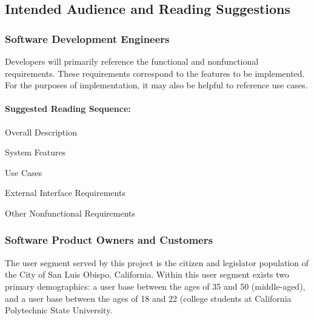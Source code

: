 \documentclass[12pt,oneside,letterpaper]{article}
\newcounter{use_case}
\newcounter{functional_requirement}
\begin{document}
\subsection{Intended Audience and Reading Suggestions}

\subsubsection{Software Development Engineers}
Developers will primarily reference the functional and nonfunctional
requirements. These requirements correspond to the features to be
implemented. For the purposes of implementation, it may also be
helpful to reference use cases.

\paragraph{Suggested Reading Sequence:}
\begin{compactenum}
\item Overall Description
\item System Features
\item Use Cases
\item External Interface Requirements
\item Other Nonfunctional Requirements
\end{compactenum}

\subsubsection{Software Product Owners and Customers}
The user segment served by this project is the citizen and legislator population of
the City of San Luis Obispo, California. Within this user segment
exists two primary demographics: a user base between the ages of 35 and 50
(middle-aged), and a user base between the ages of 18 and 22 (college students
at California Polytechnic State University.

\end{document}
